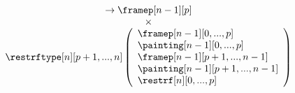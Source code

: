 \documentclass{msc}
\begin{document}
\begin{equation*}
\begin{array}{llcl}
\begin{array}{c}
      \rightarrow \framep[n-1][p] \\
      \times                      \\
      \restrftype[n][p+1,...,n]
      \left(\begin{array}{l}
                \framep[n-1][0,...,p]       \\
                \painting[n-1][0,...,p]     \\
                \framep[n-1][p+1,...,n-1]   \\
                \painting[n-1][p+1,...,n-1] \\
                \restrf[n][0,...,p]         \\
              \end{array}\right)
    \end{array}
  \end{array}
\end{equation*}
\end{document}
